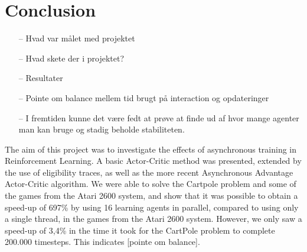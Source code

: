 \documentclass[11pt]{article}
\begin{document}
\section{Conclusion}

\begin{itemize}
    \item[--] Hvad var målet med projektet
    \item[--] Hvad skete der i projektet?
    \item[--] Resultater
    \item[--] Pointe om balance mellem tid brugt på interaction og opdateringer
    \item[--] I fremtiden kunne det være fedt at prøve at finde ud af hvor mange agenter man kan bruge og stadig beholde stabiliteten.
\end{itemize}


The aim of this project was to investigate the effects of asynchronous
training in Reinforcement Learning.
A basic Actor-Critic method was presented, extended by the use of eligibility traces,
as well as the more recent Asynchronous Advantage Actor-Critic algorithm.
We were able to solve the Cartpole problem and some of the games from the
Atari 2600 system, and show that it was possible to obtain a
speed-up of 697\% by using 16 learning agents in parallel, compared to
using only a single thread, in the games from the Atari 2600 system.
However, we only saw a speed-up of 3,4\% in the time it took for the CartPole problem
to complete 200.000 timesteps.
This indicates [pointe om balance].
\end{document}
